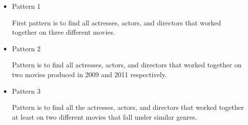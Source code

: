 \begin{itemize}

\item Pattern 1

First pattern is to find all actresses, actors, and directors that worked together on three different movies.

\item Pattern 2

Pattern is to find all actresses, actors, and directors that worked together on two movies produced in 2009 and 2011 respectively.

\item Pattern 3

Pattern is to find all the actresses, actors, and directors that worked together at least on two different movies that fall under similar genres.

\end{itemize}

